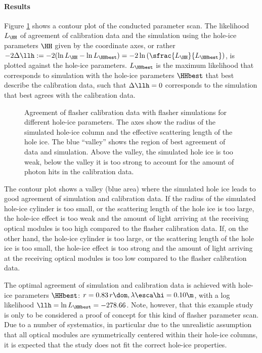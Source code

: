 \paragraph{Results}
Figure \ref{fig:ut4nao7X} shows a contour plot of the conducted parameter scan. The likelihood $L_\HH$ of agreement of calibration data and the simulation using the hole-ice parameters $\HH$ given by the coordinate axes, or rather $-2\Delta\llh:= -2(\ln L_\HH - \ln L_\HHbest) = -2 \ln \left(\sfrac{L_\HH}{L_\HHbest}\right)$, is plotted against the hole-ice parameters. $L_\HHbest$ is the maximum likelihood that corresponds to simulation with the hole-ice parameters $\HHbest$ that best describe the calibration data, such that $\Delta\llh = 0$ corresponds to the simulation that best agrees with the calibration data.

\begin{figure}[htbp]
  \caption{Agreement of flasher calibration data with flasher simulations for different hole-ice parameters. The axes show the radius of the simulated hole-ice column and the effective scattering length of the hole ice. The blue ``valley'' shows the region of best agreement of data and simulation. Above the valley, the simulated hole ice is too weak, below the valley it is too strong to account for the amount of photon hits in the calibration data.}
  \label{fig:ut4nao7X}
\end{figure}

The contour plot shows a valley (blue area) where the simulated hole ice leads to good agreement of simulation and calibration data.
If the radius of the simulated hole-ice cylinder is too small, or the scattering length of the hole ice is too large, the hole-ice effect is too weak and the amount of light arriving at the receiving optical modules is too high compared to the flasher calibration data.
If, on the other hand, the hole-ice cylinder is too large, or the scattering length of the hole ice is too small, the hole-ice effect is too strong and the amount of light arriving at the receiving optical modules is too low compared to the flasher calibration data.

The optimal agreement of simulation and calibration data is achieved with hole-ice parameters $\HHbest$: $r = 0.83\,r\dom, \lambda\esca\hi = 0.10\m$, with a log likelihood $\llh = \ln L_\HHbest = -278.66$. Note, however, that this example study is only to be considered a proof of concept for this kind of flasher parameter scan. Due to a number of systematics, in particular due to the unrealistic assumption that all optical modules are symmetrically centered within their hole-ice columns, it is expected that the study does not fit the correct hole-ice properties.

